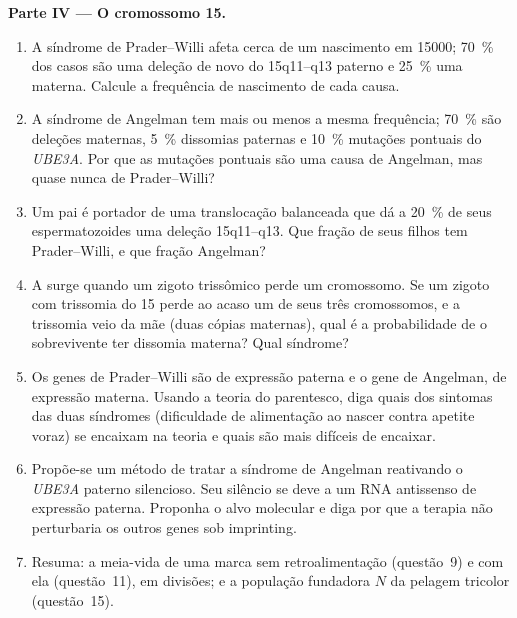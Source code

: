 \begin{problem}
\medskip
\noindent\textbf{Parte IV --- O cromossomo 15.}
\begin{enumerate}[resume]
  \item A síndrome de Prader--Willi afeta cerca de um nascimento em
        \num{15000}; \qty{70}{\%} dos casos são uma deleção de novo do
        15q11--q13 paterno e \qty{25}{\%} uma 
        materna. Calcule a frequência de nascimento de cada causa.
  \item A síndrome de Angelman tem mais ou menos a mesma frequência;
        \qty{70}{\%} são deleções maternas, \qty{5}{\%} dissomias
        paternas e \qty{10}{\%} mutações pontuais do \emph{UBE3A}. Por
        que as mutações pontuais são uma causa de Angelman, mas quase
        nunca de Prader--Willi?
  \item Um pai é portador de uma translocação balanceada que dá a
        \qty{20}{\%} de seus espermatozoides uma deleção 15q11--q13.
        Que fração de seus filhos tem Prader--Willi, e que fração
        Angelman?
  \item A  surge quando um zigoto trissômico perde
        um cromossomo. Se um zigoto com trissomia do 15 perde ao acaso
        um de seus três cromossomos, e a trissomia veio da mãe (duas
        cópias maternas), qual é a probabilidade de o sobrevivente ter
        dissomia materna? Qual síndrome?
  \item Os genes de Prader--Willi são de expressão paterna e o gene de
        Angelman, de expressão materna. Usando a teoria do parentesco,
        diga quais dos sintomas das duas síndromes (dificuldade de
        alimentação ao nascer contra apetite voraz) se encaixam na
        teoria e quais são mais difíceis de encaixar.
  \item Propõe-se um método de tratar a síndrome de Angelman
        reativando o \emph{UBE3A} paterno silencioso. Seu silêncio se
        deve a um RNA antissenso de expressão paterna. Proponha o alvo
        molecular e diga por que a terapia não perturbaria os outros
        genes sob imprinting.
  \item Resuma: a meia-vida de uma marca sem retroalimentação
        (questão~9) e com ela (questão~11), em divisões; e a população
        fundadora $N$ da pelagem tricolor (questão~15).
\end{enumerate}
\end{problem}
